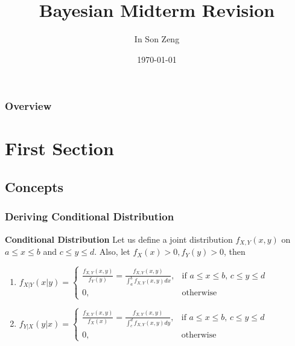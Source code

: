 \documentclass{beamer}
\title[Bayesian Midterm Revision]{Bayesian Midterm Revision} %
\author{In Son Zeng} %
\institute[University of Michigan] %
{
University of Michigan \\ %
\medskip
\textit{insonz@umich.edu} %
}
\date{\today} %
\begin{document}
\begin{frame}
\titlepage %
\end{frame}

\begin{frame}
\frametitle{Overview} %
\tableofcontents %
\end{frame}


\section{First Section} %

\subsection{Concepts} %




\begin{frame}
\frametitle{Deriving Conditional Distribution}
\textbf{Conditional Distribution}
Let us define a joint distribution $f_{X,Y}(x,y)$ on $a\le x \le b$ and $c\le y \le d$. Also, let $f_X(x)>0, f_Y(y) >0$, then
\begin{enumerate}
\item $f_{X|Y}(x|y) =\begin{cases}
			\frac{f_{X,Y}(x,y)}{f_Y(y)} = \frac{f_{X,Y}(x,y)}{\int_a^b f_{X,Y}(x,y)dx}, & \text{if $a\le x \le b$, $c\le y \le d$}\\
            0, & \text{otherwise}
		 \end{cases}$
\item $f_{Y|X}(y|x) =\begin{cases}
			\frac{f_{X,Y}(x,y)}{f_X(x)} = \frac{f_{X,Y}(x,y)}{\int_c^d f_{X,Y}(x,y)dy}, & \text{if $a\le x \le b$, $c\le y \le d$}\\
            0, & \text{otherwise}
		 \end{cases}$

\end{enumerate}
\end{frame}
\end{document}
